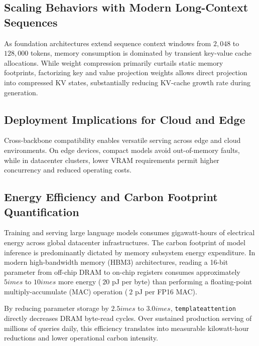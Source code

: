 \subsection{Scaling Behaviors with Modern Long-Context Sequences}
As foundation architectures extend sequence context windows from $2{,}048$ to $128{,}000$ tokens, memory consumption is dominated by transient key-value cache allocations. While weight compression primarily curtails static memory footprints, factorizing key and value projection weights allows direct projection into compressed KV states, substantially reducing KV-cache growth rate during generation.

\subsection{Deployment Implications for Cloud and Edge}
Cross-backbone compatibility enables versatile serving across edge and cloud environments. On edge devices, compact models avoid out-of-memory faults, while in datacenter clusters, lower VRAM requirements permit higher concurrency and reduced operating costs.

\subsection{Energy Efficiency and Carbon Footprint Quantification}
Training and serving large language models consumes gigawatt-hours of electrical energy across global datacenter infrastructures. The carbon footprint of model inference is predominantly dictated by memory subsystem energy expenditure. In modern high-bandwidth memory (HBM3) architectures, reading a 16-bit parameter from off-chip DRAM to on-chip registers consumes approximately $5	imes$ to $10	imes$ more energy ($~20$ pJ per byte) than performing a floating-point multiply-accumulate (MAC) operation ($~2$ pJ per FP16 MAC).

By reducing parameter storage by $2.5	imes$ to $3.0	imes$, \texttt{templateattention} directly decreases DRAM byte-read cycles. Over sustained production serving of millions of queries daily, this efficiency translates into measurable kilowatt-hour reductions and lower operational carbon intensity.

